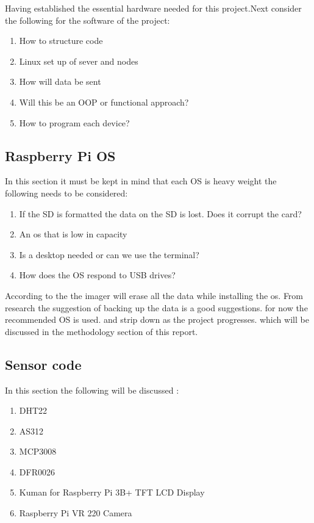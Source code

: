 
Having established the  essential hardware needed for this project.Next consider the following  for the software of the  project:
	\begin{enumerate}
	    \item How to structure code 
	    \item Linux set up of sever and nodes
	    \item How will data be sent
	    \item Will this be an OOP or functional  approach?
	    \item How to program each device?
	\end{enumerate}
	\subsection{Raspberry Pi OS}
	\label{pi os}
	In this section it must be kept in mind  that each OS is  heavy weight the following needs to be considered:
	\begin{enumerate}
		\item If the SD is formatted  the  data on the SD is lost. Does it corrupt the card?
		\item An os that is low in capacity 
		\item Is a desktop needed or can we  use  the  terminal?
		\item How does  the OS  respond to USB drives?
	\end{enumerate}

	According to the \cite{projects} the imager will erase all the data while installing the os. From research  the suggestion of backing up the data is  a  good suggestions.
	for now the recommended OS is used. and  strip down as the project progresses. which will be  discussed  in the methodology section of this report.
	
	\subsection{Sensor code}
	In this section the following will be discussed :
	\begin{enumerate}
		\item DHT22
		\item AS312
		\item MCP3008
		\item DFR0026
		\item Kuman for Raspberry Pi 3B+ TFT LCD Display
		\item Raspberry Pi VR 220 Camera 
	\end{enumerate}

